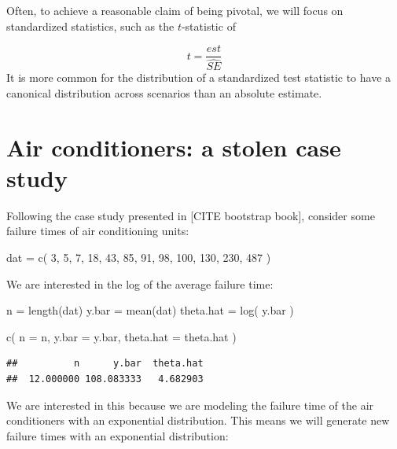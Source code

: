 \documentclass[
]{book}
\newenvironment{Shaded}{\begin{snugshade}}{\end{snugshade}}
\newcommand{\AttributeTok}[1]{\textcolor[rgb]{0.77,0.63,0.00}{#1}}
\newcommand{\DecValTok}[1]{\textcolor[rgb]{0.00,0.00,0.81}{#1}}
\newcommand{\FunctionTok}[1]{\textcolor[rgb]{0.00,0.00,0.00}{#1}}
\newcommand{\NormalTok}[1]{#1}
\newcommand{\OtherTok}[1]{\textcolor[rgb]{0.56,0.35,0.01}{#1}}
\begin{document}
Often, to achieve a reasonable claim of being pivotal, we will focus on standardized statistics, such as the \(t\)-statistic of

\[ t = \frac{est}{\widehat{SE}} \]
It is more common for the distribution of a standardized test statistic to have a canonical distribution across scenarios than an absolute estimate.

\hypertarget{air-conditioners-a-stolen-case-study}{%
\section{Air conditioners: a stolen case study}\label{air-conditioners-a-stolen-case-study}}

Following the case study presented in {[}CITE bootstrap book{]}, consider some failure times of air conditioning units:

\begin{Shaded}
\begin{Highlighting}[]
\NormalTok{dat }\OtherTok{=} \FunctionTok{c}\NormalTok{( }\DecValTok{3}\NormalTok{, }\DecValTok{5}\NormalTok{, }\DecValTok{7}\NormalTok{, }\DecValTok{18}\NormalTok{, }\DecValTok{43}\NormalTok{, }\DecValTok{85}\NormalTok{, }\DecValTok{91}\NormalTok{, }\DecValTok{98}\NormalTok{, }\DecValTok{100}\NormalTok{, }\DecValTok{130}\NormalTok{, }\DecValTok{230}\NormalTok{, }\DecValTok{487}\NormalTok{ )}
\end{Highlighting}
\end{Shaded}

We are interested in the log of the average failure time:

\begin{Shaded}
\begin{Highlighting}[]
\NormalTok{n }\OtherTok{=} \FunctionTok{length}\NormalTok{(dat)}
\NormalTok{y.bar }\OtherTok{=} \FunctionTok{mean}\NormalTok{(dat)}
\NormalTok{theta.hat }\OtherTok{=} \FunctionTok{log}\NormalTok{( y.bar )}

\FunctionTok{c}\NormalTok{( }\AttributeTok{n =}\NormalTok{ n, }\AttributeTok{y.bar =}\NormalTok{ y.bar, }\AttributeTok{theta.hat =}\NormalTok{ theta.hat )}
\end{Highlighting}
\end{Shaded}

\begin{verbatim}
##          n      y.bar  theta.hat 
##  12.000000 108.083333   4.682903
\end{verbatim}

We are interested in this because we are modeling the failure time of the air conditioners with an exponential distribution.
This means we will generate new failure times with an exponential distribution:
\end{document}
